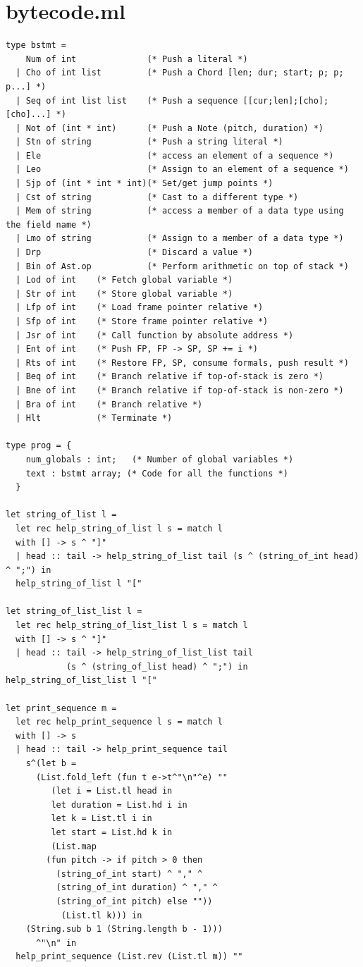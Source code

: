 \documentclass[12pt,A4]{book}
\begin{document}
\section{bytecode.ml}
\begin{verbatim}
type bstmt =
    Num of int              (* Push a literal *)
  | Cho of int list         (* Push a Chord [len; dur; start; p; p; p...] *)
  | Seq of int list list    (* Push a sequence [[cur;len];[cho];[cho]...] *)
  | Not of (int * int)      (* Push a Note (pitch, duration) *)
  | Stn of string           (* Push a string literal *)
  | Ele                     (* access an element of a sequence *)
  | Leo                     (* Assign to an element of a sequence *)
  | Sjp of (int * int * int)(* Set/get jump points *)
  | Cst of string           (* Cast to a different type *)
  | Mem of string           (* access a member of a data type using the field name *)
  | Lmo of string           (* Assign to a member of a data type *)
  | Drp                     (* Discard a value *)
  | Bin of Ast.op           (* Perform arithmetic on top of stack *)
  | Lod of int    (* Fetch global variable *)
  | Str of int    (* Store global variable *)
  | Lfp of int    (* Load frame pointer relative *)
  | Sfp of int    (* Store frame pointer relative *)
  | Jsr of int    (* Call function by absolute address *)
  | Ent of int    (* Push FP, FP -> SP, SP += i *)
  | Rts of int    (* Restore FP, SP, consume formals, push result *)
  | Beq of int    (* Branch relative if top-of-stack is zero *)
  | Bne of int    (* Branch relative if top-of-stack is non-zero *)
  | Bra of int    (* Branch relative *)
  | Hlt           (* Terminate *)

type prog = {
    num_globals : int;   (* Number of global variables *)
    text : bstmt array; (* Code for all the functions *)
  }
  
let string_of_list l = 
  let rec help_string_of_list l s = match l
  with [] -> s ^ "]"
  | head :: tail -> help_string_of_list tail (s ^ (string_of_int head) ^ ";") in
  help_string_of_list l "["
    
let string_of_list_list l =
  let rec help_string_of_list_list l s = match l
  with [] -> s ^ "]"
  | head :: tail -> help_string_of_list_list tail 
            (s ^ (string_of_list head) ^ ";") in help_string_of_list_list l "["
    
let print_sequence m = 
  let rec help_print_sequence l s = match l 
  with [] -> s 
  | head :: tail -> help_print_sequence tail 
	s^(let b = 
	  (List.fold_left (fun t e->t^"\n"^e) "" 
	     (let i = List.tl head in 
	     let duration = List.hd i in 
	     let k = List.tl i in 
	     let start = List.hd k in 
	     (List.map 
		(fun pitch -> if pitch > 0 then
		  (string_of_int start) ^ "," ^ 
		  (string_of_int duration) ^ "," ^ 
		  (string_of_int pitch) else ""))
	       (List.tl k))) in 
	(String.sub b 1 (String.length b - 1)))
      ^"\n" in 
  help_print_sequence (List.rev (List.tl m)) ""
    

\end{verbatim}
\end{document}
